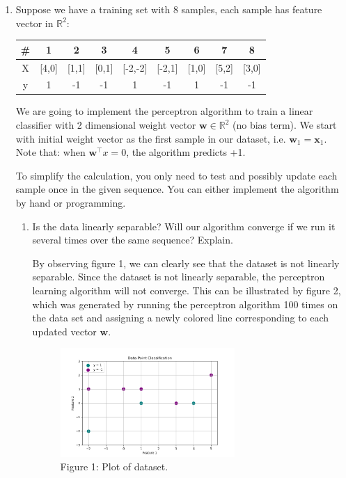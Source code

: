 \documentclass[letterpaper]{article}
\theoremstyle{definition}
\begin{document}
\begin{enumerate}
\item Suppose we have a training set with 8 samples, each sample has feature vector in
\(\mathbb{R}^{2}\):
\begin{center}
\begin{tabular}{|c|c|c|c|c|c|c|c|c|}
\hline
\# & 1 & 2 & 3 & 4 & 5 & 6 & 7 & 8\\[0pt]
\hline
X & [4,0] & [1,1] & [0,1] & [-2,-2] & [-2,1] & [1,0] & [5,2] & [3,0]\\[0pt]
\hline
y & 1 & -1 & -1 & 1 & -1 & 1 & -1 & -1\\[0pt]
\hline
\end{tabular}
\end{center}

We are going to implement the perceptron algorithm to train a linear classifier with 2
dimensional weight vector \(\mathbf{w} \in \mathbb{R}^{2}\) (no bias term). We start with
initial weight vector as the first sample in our dataset, i.e. \(\mathbf{w}_{1}=\mathbf{x}_{1}\).
Note that: when \(\mathbf{w}^{\top} x=0\), the algorithm predicts +1.

To simplify the calculation, you only need to test and possibly update each sample once in the
given sequence. You can either implement the algorithm by hand or programming.

\begin{enumerate}
\item Is the data linearly separable?
Will our algorithm converge if we run it several times over the same sequence? Explain.

\color{teal}
By observing figure 1, we can clearly see that the dataset is not linearly separable.
Since the dataset is not linearly separable, the perceptron learning algorithm will not
converge. This can be illustrated by figure 2, which was generated by running the perceptron
algorithm 100 times on the data set and assigning a newly colored line corresponding to each
updated vector \(\mathbf{w}\).
\color{black}

\begin{figure}[htbp]
\centering
\includegraphics[width=250]{../assets/hw1_fig1.png}
\caption{Figure 1: Plot of dataset.}
\end{figure}


\end{enumerate}
\end{enumerate}
\end{document}
